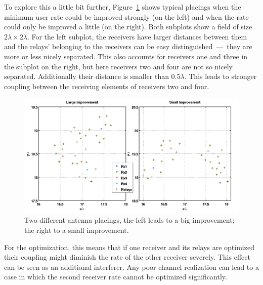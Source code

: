 To explore this a little bit further, Figure~\ref{fig:4user_placing} shows typical placings when the minimum user rate could be improved strongly (on the left) and when the rate could only be improved a little (on the right).
Both subplots show a field of size $2\lambda \times 2\lambda$.
For the left subplot, the receivers have larger distances between them and the relays' belonging to the receivers can be easy distinguished~---~they are more or less nicely separated.
This also accounts for receivers one and three in the subplot on the right, but here receivers two and four are not so nicely separated.
Additionally their distance is smaller than $0.5\lambda$.
This leads to stronger coupling between the receiving elements of receivers two and four.
\begin{figure}[h]
\centering
  \includegraphics[width=0.8\linewidth]{images/Antenna_placing_4user.png}
\caption{Two different antenna placings, the left leads to a big improvement; the right to a small improvement.}
\label{fig:4user_placing}
\end{figure}
For the optimization, this means that if one receiver and its relays are optimized their coupling might diminish the rate of the other receiver severely.
This effect can be seen as an additional interferer.
Any poor channel realization can lead to a case in which the second receiver rate cannot be optimized significantly.


